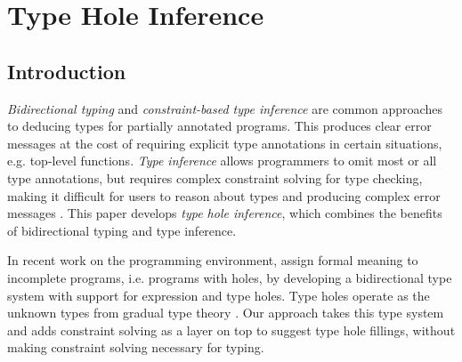 



\section{Type Hole Inference}
\subsection{Introduction}
\label{sec:intro}


\emph{Bidirectional typing} and \emph{constraint-based type inference} are common approaches to deducing types for partially annotated programs. 
This produces clear error messages at the cost of requiring explicit type annotations in certain situations, e.g. top-level functions. \emph{Type inference} allows programmers to omit most or all type annotations, but requires complex constraint solving for type checking, making it difficult for users to reason about types and producing complex error messages \cite{typeinferDif}.
This paper develops \emph{type hole inference}, which combines the benefits of bidirectional typing and type inference.\par

In recent work on the \Hazel programming environment, \citet{HazelnutPOPL} assign formal meaning to incomplete programs, i.e. programs with holes, by developing a bidirectional type system with support for expression and type holes. Type holes operate as the unknown types from gradual type theory \cite{GradualTyping}. Our approach takes this type system and adds constraint solving as a layer on top to suggest type hole fillings, without making constraint solving necessary for typing. 

